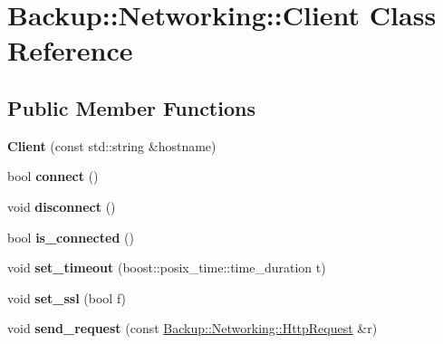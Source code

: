 \hypertarget{class_backup_1_1_networking_1_1_client}{}\section{Backup\+:\+:Networking\+:\+:Client Class Reference}
\label{class_backup_1_1_networking_1_1_client}
\subsection*{Public Member Functions}
\begin{DoxyCompactItemize}
\item 
\mbox{\label{class_backup_1_1_networking_1_1_client_a787bea154370a9d165b0fa4f2a9340a1}} 
{\bfseries Client} (const std\+::string \&hostname)
\item 
\mbox{\label{class_backup_1_1_networking_1_1_client_abccb976632db0b3b5df925875b80b2e7}} 
bool {\bfseries connect} ()
\item 
\mbox{\label{class_backup_1_1_networking_1_1_client_a97e144b48409c0a9873eee09f04ce724}} 
void {\bfseries disconnect} ()
\item 
\mbox{\label{class_backup_1_1_networking_1_1_client_a1654a80c5c715694b9ad5a8f7db8b6b0}} 
bool {\bfseries is\+\_\+connected} ()
\item 
\mbox{\label{class_backup_1_1_networking_1_1_client_a32bc5f8ee7fab0d86e86247a1a6a3d21}} 
void {\bfseries set\+\_\+timeout} (boost\+::posix\+\_\+time\+::time\+\_\+duration t)
\item 
\mbox{\label{class_backup_1_1_networking_1_1_client_a414faccfe00dacbb75f4bdf92a531770}} 
void {\bfseries set\+\_\+ssl} (bool f)
\item 
\mbox{\label{class_backup_1_1_networking_1_1_client_a48973fb82474072290509dc6e7bd369a}} 
void {\bfseries send\+\_\+request} (const \hyperlink{class_backup_1_1_networking_1_1_http_request}{Backup\+::\+Networking\+::\+Http\+Request} \&r)

\end{DoxyCompactItemize}

